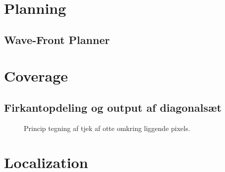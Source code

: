 \appendices
\section{Planning}
\subsection{Wave-Front Planner}
\label{app:wave}


\newpage
\section{Coverage}
\subsection{Firkantopdeling og output af diagonalsæt}
\label{app:firkant}

\begin{figure}[!th]
\centering
\begin{tikzpicture}[scale=0.95]

\end{tikzpicture}
\caption[tekst i indholdsfortegnelsen]{Princip tegning af tjek af otte omkring liggende pixels.}
\label{fig:principotte}
\end{figure}
\newpage
%


\newpage
\section{Localization}
